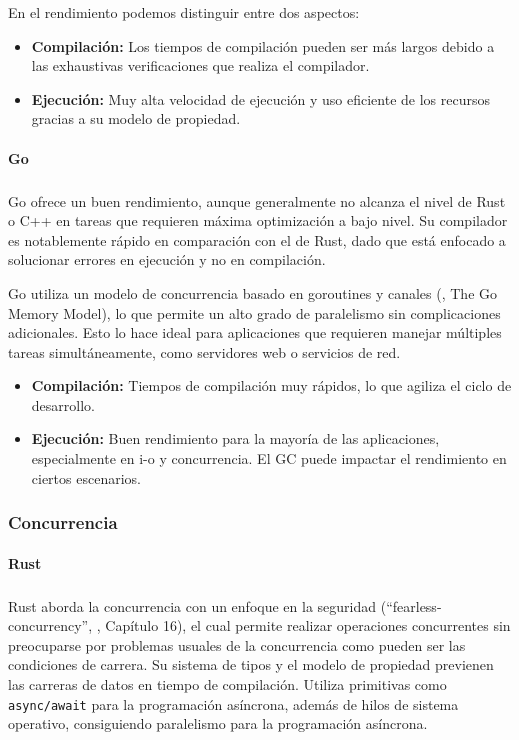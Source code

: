 En el rendimiento podemos distinguir entre dos aspectos:
\begin{itemize}
    \item \textbf{Compilación:} Los tiempos de compilación pueden ser más largos debido a las exhaustivas verificaciones que realiza el compilador.
    \item \textbf{Ejecución:} Muy alta velocidad de ejecución y uso eficiente de los recursos gracias a su modelo de propiedad.
\end{itemize}

\paragraph{Go}
\subparagraph{}

Go ofrece un buen rendimiento, aunque generalmente no alcanza el nivel de Rust o C++ en tareas que requieren máxima optimización a bajo nivel. Su compilador es notablemente rápido en comparación con el de Rust, dado que está enfocado a solucionar errores en ejecución y no en compilación.

Go utiliza un modelo de concurrencia basado en \glspl{goroutine} y canales (\cite{go-documentation}, The Go Memory Model), lo que permite un alto grado de paralelismo sin complicaciones adicionales. Esto lo hace ideal para aplicaciones que requieren manejar múltiples tareas simultáneamente, como servidores web o servicios de red.

\begin{itemize}
    \item \textbf{Compilación:} Tiempos de compilación muy rápidos, lo que agiliza el ciclo de desarrollo.
    \item \textbf{Ejecución:} Buen rendimiento para la mayoría de las aplicaciones, especialmente en \acrshort{i-o} y concurrencia. El GC puede impactar el rendimiento en ciertos escenarios.
\end{itemize}

\subsubsection{Concurrencia}
\paragraph{Rust}
\subparagraph{}

Rust aborda la concurrencia con un enfoque en la seguridad (``\gls{fearless-concurrency}'', \cite{rustbook2024}, Capítulo 16), el cual permite realizar operaciones concurrentes sin preocuparse por problemas usuales de la concurrencia como pueden ser las condiciones de carrera.
Su sistema de tipos y el modelo de propiedad previenen las carreras de datos en tiempo de compilación.
Utiliza primitivas como \texttt{async/await} para la programación asíncrona, además de hilos de sistema operativo, consiguiendo paralelismo para la programación asíncrona.

